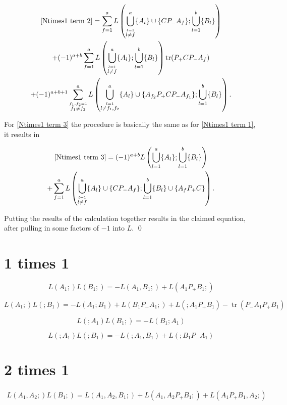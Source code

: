 \documentclass[b5paper,draft,openbib,12pt]{memoir}
\DeclareMathOperator{\tr}{tr}
\begin{document}
\begin{multline}
\eqref{Ntimes1 term 2}=\sum_{f=1}^a L\left( \bigcup_{\stackrel{l=1}{l\neq f}}^a \{A_l\}\cup \{C P_- A_f\}; \bigcup_{l=1}^b \{B_l\}\right)\\
+(-1)^{a+b}\sum_{f=1}^a  L\left( \bigcup_{\stackrel{l=1}{l\neq f}}^a \{A_l\}; \bigcup_{l=1}^b \{B_l\} \right) \tr (P_+ C P_- A_f )\\
+(-1)^{a+b+1}\sum_{\stackrel{f_1,f_2=1}{f_1\neq f_2}}^a L\left( \bigcup_{\stackrel{l=1}{l\neq f_1,f_2}}^a \{A_l\} \cup \{A_{f_2} P_+CP_- A_{f_1} \}; \bigcup_{l=1}^b \{B_l\} \right).
\end{multline}

For \eqref{Ntimes1 term 3} the procedure is basically the same as for \eqref{Ntimes1 term 1}, it results in

\begin{multline}
\eqref{Ntimes1 term 3}= (-1)^{a+b} L\left( \bigcup_{l=1}^a \{A_l\}; \bigcup_{l=1}^b \{B_l\}\right)\\
+ \sum_{f=1}^a L\left( \bigcup_{\stackrel{l=1}{l \neq f}}^a \{A_l\}\cup \{C P_- A_f\}; \bigcup_{l=1}^b \{B_l\}\cup \{A_f P_+ C\}\right).
\end{multline}

Putting the results of the calculation together results in the claimed equation, after pulling in some factors of \(-1\) into \(L\). \qed

\section{ 1 times 1}

\begin{equation}
L(A_1;)L(B_1;)=-L(A_1,B_1;) + L(A_1P_+B_1;)
\end{equation}

\begin{equation}
L(A_1;)L(;B_1)=-L(A_1 ;B_1) +L(B_1P_-A_1;) + L(;A_1P_+B_1) -\tr(P_-A_1P_+B_1)
\end{equation}

\begin{equation}
L(;A_1)L(B_1;)=-L(B_1;A_1)
\end{equation}

\begin{equation}
L(;A_1)L(;B_1)=-L(;A_1,B_1) + L(;B_1P_-A_1)
\end{equation}


\section{2 times 1}
\begin{multline}
L(A_1,A_2;)L(B_1;)=L(A_1,A_2,B_1;) + L(A_1,A_2P_+B_1;) + L(A_1P_+B_1,A_2;)
\end{multline}
\end{document}
